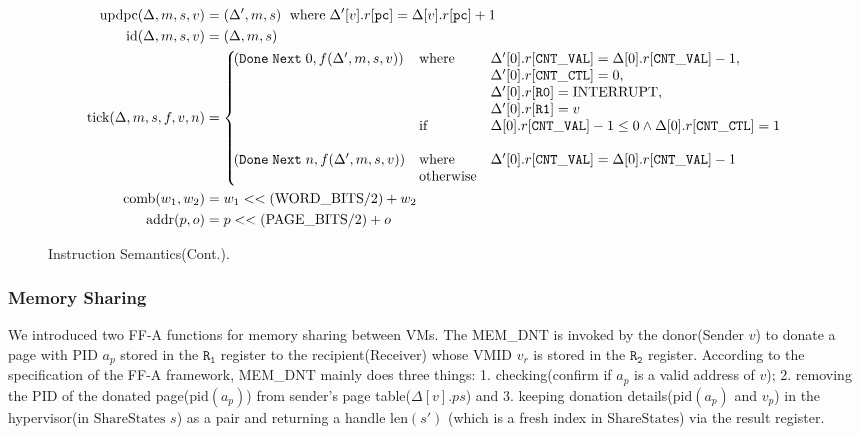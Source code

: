 \documentclass[a4paper]{article}
\newcommand*{\SSS}{\text{ShareStates}}
\newcommand*{\PID}{\text{PID}}
\newcommand*{\VMID}{\text{VMID}}
\newcommand*{\PPBITS}{\text{PAGE\_BITS}}
\newcommand*{\PWBITS}{\text{WORD\_BITS}}
\newcommand*{\updpc}{\text{updpc}}
\begin{document}
\begin{figure}[!h]
  \begin{align*}
    \updpc(\Delta,m,s,v)&=(\Delta',m,s)\ \; \text{where}\; \Delta'[v].r[\mathtt{pc}] = \Delta[v].r[\mathtt{pc}]+1\\
    \text{id}(\Delta,m,s,v)& = (\Delta,m,s)\\
    \nextt(\Delta,m,s,f,v,n)&= \left\{\!\!\!\!\begin{array}{lll}
                                \DNXT{0}{f(\Delta',m,s,v)} &\text{where } %
                                & \Delta'[0].r[\mathtt{CNT\_VAL}] = \Delta[0].r[\mathtt{CNT\_VAL}] -1,\\
                                & &\Delta'[0].r[\mathtt{CNT\_CTL}] = 0,\\
                                & &\Delta'[0].r[\mathtt{R0}]=\toword{INTERRUPT},\\
                                & &\Delta'[0].r[\mathtt{R1}] = v\\
                                & \text{if}%
                                &\Delta[0].r[\mathtt{CNT\_VAL}] -1 \le 0\land\Delta[0].r[\mathtt{CNT\_CTL}] = 1\\
                                \\
                                \DNXT{n}{f(\Delta',m,s,v)} &\text{where}%
                                &\Delta'[0].r[\mathtt{CNT\_VAL}] = \Delta[0].r[\mathtt{CNT\_VAL}] -1\\
                                & \text{otherwise}\\
                                              \end{array}  \right.\\
    \text{comb}(w_{1},w_{2})&=w_{1}<<(\PWBITS/2)+w_{2}\\
    \text{addr}(p,o)&=p<<(\PPBITS/2)+o
  \end{align*}
  \caption{Instruction Semantics(Cont.).}
\end{figure}
\subsubsection{Memory Sharing}
We introduced two FF-A functions for memory sharing between VMs. The MEM\_DNT is
invoked by the donor(Sender $v$) to donate a page with $\PID$ $a_{p}$ stored in
the $\mathtt{R_{1}}$ register to the recipient(Receiver) whose $\VMID$ $v_{r}$
is stored in the $\mathtt{R_{2}}$ register. According to the specification of
the FF-A framework, MEM\_DNT mainly does three things: 1. checking(confirm if
$a_{p}$ is a valid address of $v$); 2. removing the $\PID$ of the donated
page($\text{pid}(a_{p})$) from sender's page table($\Delta[v].ps$) and 3.
keeping donation details($\text{pid}(a_{p})$ and $v_{p}$) in the hypervisor(in
$\SSS$ $s$) as a pair and returning a handle $\text{len}(s')$ (which is a fresh index
in $\SSS$) via the result register.
\end{document}
